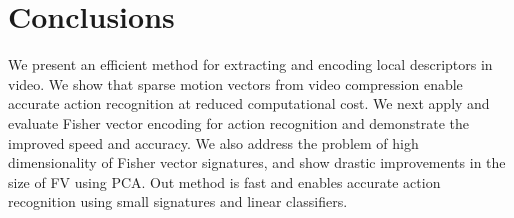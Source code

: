 \documentclass[10pt,twocolumn,letterpaper]{article}
\begin{document}
\section{Conclusions}
We present an efficient method for extracting and encoding local descriptors in video. We show that sparse motion vectors from video compression enable accurate action recognition at reduced computational cost. We next apply and evaluate Fisher vector encoding for action recognition and demonstrate the improved speed and accuracy.
We also address the problem of high dimensionality of Fisher vector signatures, and show drastic improvements in the size of FV using PCA. 
Out method is fast and enables accurate action recognition using small signatures and linear classifiers.


{
\small


}
\end{document}
